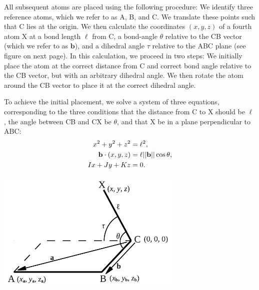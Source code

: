 \documentclass[12pt]{article}
\begin{document}
All subsequent atoms are placed using the following procedure: We identify three reference atoms, which we refer to as A, B, and C. We translate these points such that C lies at the origin. We then calculate the coordinates $(x, y, z)$ of a fourth atom X at a bond length $\ell$ from C, a bond-angle $\theta$ relative to the CB vector (which we refer to as $\mathbf{b}$), and a dihedral angle $\tau$ relative to the ABC plane (see figure on next page). In this calculation, we proceed in two steps: We initially place the atom at the correct distance from C and correct bond angle relative to the CB vector, but with an arbitrary dihedral angle. We then rotate the atom around the CB vector to place it at the correct dihedral angle.


To achieve the initial placement, we solve a system of three equations, corresponding to the three conditions that the distance from C to X should be $\ell$, the angle between CB and CX be $\theta$, and that X be in a plane perpendicular to ABC:
\begin{align}
x^2 + y^2 + z^2 &= \ell^2, \label{eq:dist}\\
{\bf b} \cdot (x,y,z) &= \ell  ||{\bf b}|| \cos{\theta}, \label{eq:angle}\\
Ix + Jy +Kz &=0. \label{eq:plane}
\end{align}
\bigskip


\centerline{\includegraphics[width=3.5in]{figures/atom_placement}}
\end{document}
